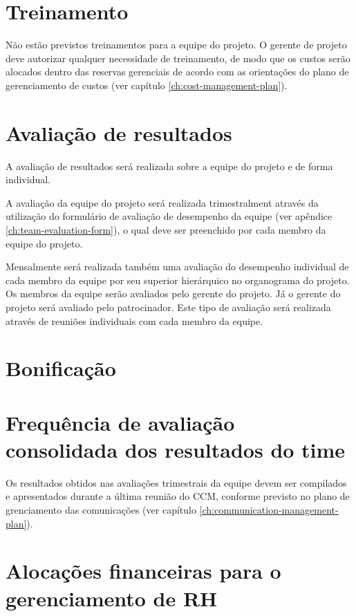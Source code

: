 \section{Treinamento}

Não estão previstos treinamentos para a equipe do projeto. O gerente de projeto deve autorizar qualquer necessidade de treinamento, de modo que os custos serão alocados dentro das reservas gerenciais de acordo com as orientações do plano de gerenciamento de custos (ver capítulo \ref{ch:cost-management-plan}).

\section{Avaliação de resultados}

A avaliação de resultados será realizada sobre a equipe do projeto e de forma individual. 

A avaliação da equipe do projeto será realizada trimestralment através da utilização do formulário de avaliação de desempenho da equipe (ver apêndice \ref{ch:team-evaluation-form}), o qual deve ser preenchido por cada membro da equipe do projeto.

Mensalmente será realizada também uma avaliação do desempenho individual de cada membro da equipe por seu superior hierárquico no organograma do projeto. Os membros da equipe serão avaliados pelo gerente do projeto. Já o gerente do projeto será avaliado pelo patrocinador. Este tipo de avaliação será realizada através de reuniões individuais com cada membro da equipe.

\section{Bonificação}


\section{Frequência de avaliação consolidada dos resultados do time}

Os resultados obtidos nas avaliações trimestrais da equipe devem ser compilados e apresentados durante a última reunião do CCM, conforme previsto no plano de grenciamento das comunicações (ver capítulo \ref{ch:communication-management-plan}).

\section{Alocações financeiras para o gerenciamento de RH}


